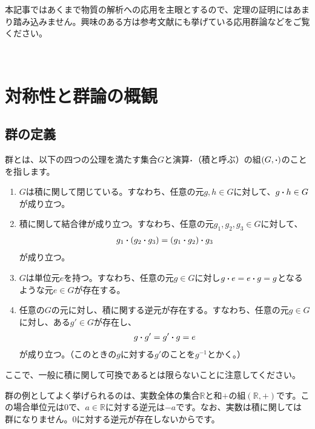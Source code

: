 \documentclass[uplatex,dvipdfmx]{jsarticle}
\begin{document}
本記事ではあくまで物質の解析への応用を主眼とするので、定理の証明にはあまり踏み込みません。興味のある方は参考文献にも挙げている応用群論\cite{ouyougunron}などをご覧ください。


 


\section{対称性と群論の概観}
\subsection{群の定義}
群とは、以下の四つの公理を満たす集合$G$と演算$\vdot$（積と呼ぶ）の組$(G, \vdot)$のことを指します。
\begin{tcolorbox}[title = 群の公理]
	\begin{enumerate}
		\item $G$は積に関して閉じている。すなわち、任意の元$g, h \in G$に対して、$g\vdot h\in G$が成り立つ。
		\item 積に関して結合律が成り立つ。すなわち、任意の元$g_1, g_2, g_3 \in G$に対して、\begin{align}
			g_1 \vdot (g_2 \vdot g_3) = (g_1 \vdot g_2) \vdot g_3
		\end{align}
		が成り立つ。
		\item $G$は単位元$e$を持つ。すなわち、任意の元$g\in G$に対し$g\vdot e = e\vdot g = g$となるような元$e\in G$が存在する。
		\item 任意の$G$の元に対し、積に関する逆元が存在する。すなわち、任意の元$g\in G$に対し、ある$g'\in G$が存在し、\begin{align}
			g \vdot g' = g' \vdot g = e
		\end{align}が成り立つ。（このときの$g$に対する$g'$のことを$g^{-1}$とかく。）
	\end{enumerate}	
\end{tcolorbox}

ここで、一般に積に関して可換であるとは限らないことに注意してください。

群の例としてよく挙げられるのは、実数全体の集合$\mathbb{R}$と和$+$の組$(\mathbb{R}, +)$です。この場合単位元は0で、$a\in \mathbb{R}$に対する逆元は$-a$です。なお、実数は積に関しては群になりません。0に対する逆元が存在しないからです。
\end{document}

